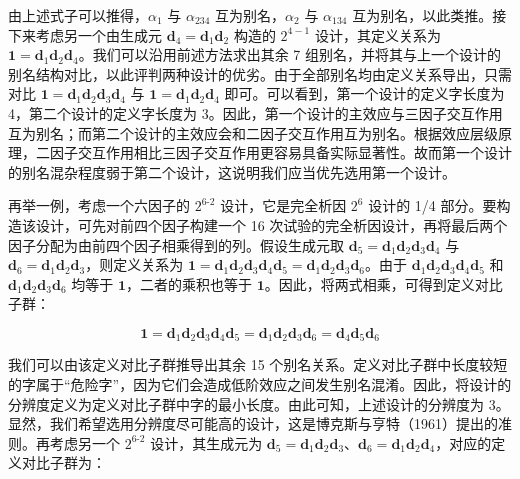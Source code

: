 \documentclass{ctexart}
\begin{document}
由上述式子可以推得，$\alpha_1$ 与 $\alpha_{234}$ 互为别名，$\alpha_2$ 与 $\alpha_{134}$ 互为别名，以此类推。接下来考虑另一个由生成元 $\boldsymbol{d}_4=\boldsymbol{d}_1\boldsymbol{d}_2$ 构造的 $2^{4-1}$ 设计，其定义关系为 $\boldsymbol{1}=\boldsymbol{d}_1\boldsymbol{d}_2\boldsymbol{d}_4$。我们可以沿用前述方法求出其余 7 组别名，并将其与上一个设计的别名结构对比，以此评判两种设计的优劣。由于全部别名均由定义关系导出，只需对比 $\boldsymbol{1}=\boldsymbol{d}_1\boldsymbol{d}_2\boldsymbol{d}_3\boldsymbol{d}_4$ 与 $\boldsymbol{1}=\boldsymbol{d}_1\boldsymbol{d}_2\boldsymbol{d}_4$ 即可。可以看到，第一个设计的定义字长度为 4，第二个设计的定义字长度为 3。因此，第一个设计的主效应与三因子交互作用互为别名；而第二个设计的主效应会和二因子交互作用互为别名。根据效应层级原理，二因子交互作用相比三因子交互作用更容易具备实际显著性。故而第一个设计的别名混杂程度弱于第二个设计，这说明我们应当优先选用第一个设计。

再举一例，考虑一个六因子的 $2^{6‑2}$ 设计，它是完全析因 $2^6$ 设计的 1/4 部分。要构造该设计，可先对前四个因子构建一个 16 次试验的完全析因设计，再将最后两个因子分配为由前四个因子相乘得到的列。假设生成元取 $\boldsymbol{d}_5=\boldsymbol{d}_1\boldsymbol{d}_2\boldsymbol{d}_3\boldsymbol{d}_4$ 与 $\boldsymbol{d}_6=\boldsymbol{d}_1\boldsymbol{d}_2\boldsymbol{d}_3$，则定义关系为 $\boldsymbol{1}=\boldsymbol{d}_1\boldsymbol{d}_2\boldsymbol{d}_3\boldsymbol{d}_4\boldsymbol{d}_5=\boldsymbol{d}_1\boldsymbol{d}_2\boldsymbol{d}_3\boldsymbol{d}_6$。由于 $\boldsymbol{d}_1\boldsymbol{d}_2\boldsymbol{d}_3\boldsymbol{d}_4\boldsymbol{d}_5$ 和 $\boldsymbol{d}_1\boldsymbol{d}_2\boldsymbol{d}_3\boldsymbol{d}_6$ 均等于 $\boldsymbol{1}$，二者的乘积也等于 $\boldsymbol{1}$。因此，将两式相乘，可得到定义对比子群：

\begin{equation*}
\boldsymbol{1}=\boldsymbol{d}_1\boldsymbol{d}_2\boldsymbol{d}_3\boldsymbol{d}_4\boldsymbol{d}_5=\boldsymbol{d}_1\boldsymbol{d}_2\boldsymbol{d}_3\boldsymbol{d}_6=\boldsymbol{d}_4\boldsymbol{d}_5\boldsymbol{d}_6
\end{equation*}

我们可以由该定义对比子群推导出其余 15 个别名关系。定义对比子群中长度较短的字属于“危险字”，因为它们会造成低阶效应之间发生别名混淆。因此，将设计的分辨度定义为定义对比子群中字的最小长度。由此可知，上述设计的分辨度为 3。显然，我们希望选用分辨度尽可能高的设计，这是博克斯与亨特（1961）提出的准则。再考虑另一个 $2^{6‑2}$ 设计，其生成元为 $\boldsymbol{d}_5=\boldsymbol{d}_1\boldsymbol{d}_2\boldsymbol{d}_3$、$\boldsymbol{d}_6=\boldsymbol{d}_1\boldsymbol{d}_2\boldsymbol{d}_4$，对应的定义对比子群为：
\end{document}
